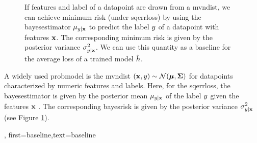 {{\begin{figure}[h]
\begin{center}
		\end{center}
		\caption{If \gls{feature}s and \gls{label} of a \gls{datapoint} are drawn from a \gls{mvndist}, we 
		can achieve minimum \gls{risk} (under \gls{sqerrloss}) by using the \gls{bayesestimator} $\mu_{y|{\bf x}}$ 
		to predict the \gls{label} $y$ of a \gls{datapoint} with \gls{feature}s ${\bf x}$. The corresponding 
		minimum \gls{risk} is given by the posterior \gls{variance} $\sigma^{2}_{y|{\bf x}}$. We can use 
		this quantity as a baseline for the average \gls{loss} of a trained \gls{model} $\hat{h}$. \label{fig_post_baseline_dict}}
	\end{figure}
A widely used \gls{probmodel} is the \gls{mvndist} $\left( {\bf x},y \right) \sim \mathcal{N}({\bm \mu},{\bm \Sigma})$ 
for \gls{datapoint}s characterized by numeric \gls{feature}s and \gls{label}s.
Here, for the \gls{sqerrloss}, the \gls{bayesestimator} is given by the posterior 
mean $\mu_{y|{\bf x}}$ of the \gls{label} $y$ given the 
\gls{feature}s ${\bf x}$ \cite{LC,GrayProbBook}. The corresponding \gls{bayesrisk} 
is given by the posterior \gls{variance} 
$\sigma^{2}_{y|{\bf x}}$ (see Figure \ref{fig_post_baseline_dict}).},
    first={baseline},text={baseline}
}

